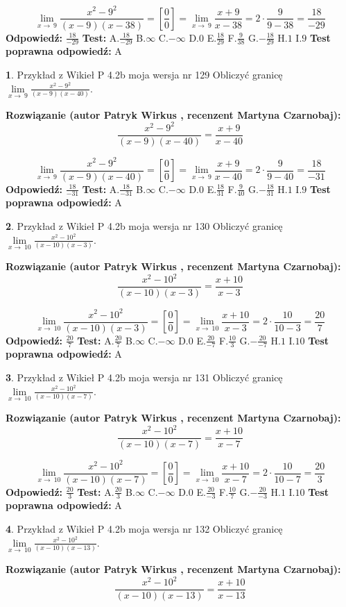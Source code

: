 \documentclass[12pt, a4paper]{article}
\theoremstyle{definition} %
\newtheorem{zad}{}
\newcommand{\zadStart}[1]{\begin{zad}#1\newline}
\newcommand{\zadStop}{\end{zad}}
\newcommand{\rozwStart}[2]{\noindent \textbf{Rozwiązanie (autor #1 , recenzent #2): }\newline}
\newcommand{\rozwStop}{\newline}
\newcommand{\odpStart}{\noindent \textbf{Odpowiedź:}\newline}
\newcommand{\odpStop}{\newline}
\newcommand{\testStart}{\noindent \textbf{Test:}\newline}
\newcommand{\testStop}{\newline}
\newcommand{\kluczStart}{\noindent \textbf{Test poprawna odpowiedź:}\newline}
\newcommand{\kluczStop}{\newline}
\begin{document}
$$\lim\limits_{x\to\ 9}\frac{x^{2}-9^{2}}{(x-9)(x-38)}=[\frac{0}{0}]=\lim\limits_{x\to\ 9}\frac{x+9}{x-38}=2 \cdot \frac{9}{9-38} = \frac{18}{-29}$$
\rozwStop
\odpStart
$\frac{18}{-29}$
\odpStop
\testStart
A.$\frac{18}{-29}$
B.$\infty$
C.$-\infty$
D.$0$
E.$\frac{18}{29}$
F.$\frac{9}{38}$
G.$-\frac{18}{29}$
H.$1$
I.$9$
\testStop
\kluczStart
A
\kluczStop



\zadStart{Przykład z Wikieł P 4.2b moja wersja nr 129}
Obliczyć granicę $\lim\limits_{x\to\ 9}\frac{x^{2}-9^{2}}{(x-9)(x-40)}$.
\zadStop
\rozwStart{Patryk Wirkus}{Martyna Czarnobaj}
$$\frac{x^{2}-9^{2}}{(x-9)(x-40)}=\frac{x+9}{x-40}$$

$$\lim\limits_{x\to\ 9}\frac{x^{2}-9^{2}}{(x-9)(x-40)}=[\frac{0}{0}]=\lim\limits_{x\to\ 9}\frac{x+9}{x-40}=2 \cdot \frac{9}{9-40} = \frac{18}{-31}$$
\rozwStop
\odpStart
$\frac{18}{-31}$
\odpStop
\testStart
A.$\frac{18}{-31}$
B.$\infty$
C.$-\infty$
D.$0$
E.$\frac{18}{31}$
F.$\frac{9}{40}$
G.$-\frac{18}{31}$
H.$1$
I.$9$
\testStop
\kluczStart
A
\kluczStop



\zadStart{Przykład z Wikieł P 4.2b moja wersja nr 130}
Obliczyć granicę $\lim\limits_{x\to\ 10}\frac{x^{2}-10^{2}}{(x-10)(x-3)}$.
\zadStop
\rozwStart{Patryk Wirkus}{Martyna Czarnobaj}
$$\frac{x^{2}-10^{2}}{(x-10)(x-3)}=\frac{x+10}{x-3}$$

$$\lim\limits_{x\to\ 10}\frac{x^{2}-10^{2}}{(x-10)(x-3)}=[\frac{0}{0}]=\lim\limits_{x\to\ 10}\frac{x+10}{x-3}=2 \cdot \frac{10}{10-3} = \frac{20}{7}$$
\rozwStop
\odpStart
$\frac{20}{7}$
\odpStop
\testStart
A.$\frac{20}{7}$
B.$\infty$
C.$-\infty$
D.$0$
E.$\frac{20}{-7}$
F.$\frac{10}{3}$
G.$-\frac{20}{-7}$
H.$1$
I.$10$
\testStop
\kluczStart
A
\kluczStop



\zadStart{Przykład z Wikieł P 4.2b moja wersja nr 131}
Obliczyć granicę $\lim\limits_{x\to\ 10}\frac{x^{2}-10^{2}}{(x-10)(x-7)}$.
\zadStop
\rozwStart{Patryk Wirkus}{Martyna Czarnobaj}
$$\frac{x^{2}-10^{2}}{(x-10)(x-7)}=\frac{x+10}{x-7}$$

$$\lim\limits_{x\to\ 10}\frac{x^{2}-10^{2}}{(x-10)(x-7)}=[\frac{0}{0}]=\lim\limits_{x\to\ 10}\frac{x+10}{x-7}=2 \cdot \frac{10}{10-7} = \frac{20}{3}$$
\rozwStop
\odpStart
$\frac{20}{3}$
\odpStop
\testStart
A.$\frac{20}{3}$
B.$\infty$
C.$-\infty$
D.$0$
E.$\frac{20}{-3}$
F.$\frac{10}{7}$
G.$-\frac{20}{-3}$
H.$1$
I.$10$
\testStop
\kluczStart
A
\kluczStop



\zadStart{Przykład z Wikieł P 4.2b moja wersja nr 132}
Obliczyć granicę $\lim\limits_{x\to\ 10}\frac{x^{2}-10^{2}}{(x-10)(x-13)}$.
\zadStop
\rozwStart{Patryk Wirkus}{Martyna Czarnobaj}
$$\frac{x^{2}-10^{2}}{(x-10)(x-13)}=\frac{x+10}{x-13}$$
\end{document}
